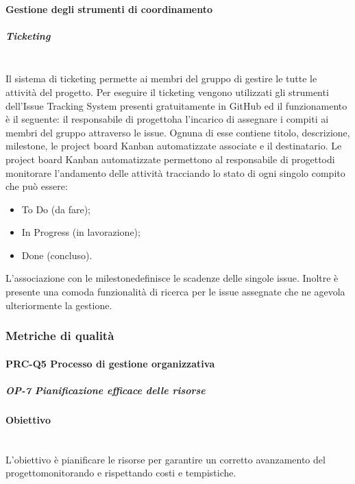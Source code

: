 		\paragraph{Gestione degli strumenti di coordinamento}
			\subparagraph{Ticketing}\mbox{}\\ [1mm]
				Il sistema di ticketing permette ai membri del gruppo di gestire le tutte le attività del progetto\glo.
				Per eseguire il ticketing vengono utilizzati gli strumenti dell'Issue Tracking System presenti gratuitamente in GitHub ed il funzionamento è il seguente:
				il responsabile di progetto\glosp ha l'incarico di assegnare i compiti ai membri del gruppo attraverso le issue. Ognuna di esse contiene titolo, descrizione, milestone, le project board Kanban automatizzate associate e il destinatario.
				Le project board Kanban automatizzate permettono al responsabile di progetto\glosp di monitorare l'andamento delle attività tracciando lo stato di ogni singolo compito che può essere:
				\begin{itemize}
					\item To Do (da fare);
					\item In Progress (in lavorazione);
					\item Done (concluso).
				\end{itemize}
				L'associazione con le milestone\glosp definisce le scadenze delle singole issue.
				Inoltre è presente una comoda funzionalità di ricerca per le issue assegnate che ne agevola ulteriormente la gestione.
				
		\subsubsection{Metriche di qualità}
		\paragraph{PRC-Q5 Processo di gestione organizzativa}
		\subparagraph{OP-7 Pianificazione efficace delle risorse}
		\paragraph*{Obiettivo}\mbox{}\\ [1mm]
		L'obiettivo è pianificare le risorse per garantire un corretto avanzamento del progetto\glosp monitorando e rispettando costi e tempistiche.
